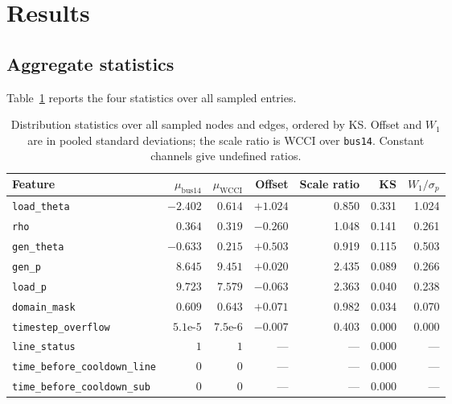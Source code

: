 \section{Results}
\label{sec:wcci-results}

\subsection{Aggregate statistics}

Table~\ref{tab:wcci-shift-all} reports the four statistics over all sampled
entries.

\begin{table}[H]
  \centering
  \small
  \caption{Distribution statistics over all sampled nodes and edges, ordered by
  KS. Offset and $W_1$ are in pooled standard deviations; the scale ratio is
  WCCI over \texttt{bus14}. Constant channels give undefined ratios.}
  \label{tab:wcci-shift-all}
  \setlength{\tabcolsep}{6pt}
  \begin{tabular}{lrrrrrr}
    \toprule
    Feature & $\mu_{\text{bus14}}$ & $\mu_{\text{WCCI}}$ & Offset & Scale ratio & KS & $W_1/\sigma_p$ \\
    \midrule
    \texttt{load\_theta}   & $-2.402$ & $0.614$ & $+1.024$ & 0.850 & 0.331 & 1.024 \\
    \texttt{rho}           & $0.364$ & $0.319$ & $-0.260$ & 1.048 & 0.141 & 0.261 \\
    \texttt{gen\_theta}    & $-0.633$ & $0.215$ & $+0.503$ & 0.919 & 0.115 & 0.503 \\
    \texttt{gen\_p}        & $8.645$ & $9.451$ & $+0.020$ & 2.435 & 0.089 & 0.266 \\
    \texttt{load\_p}       & $9.723$ & $7.579$ & $-0.063$ & 2.363 & 0.040 & 0.238 \\
    \texttt{domain\_mask}  & $0.609$ & $0.643$ & $+0.071$ & 0.982 & 0.034 & 0.070 \\
    \texttt{timestep\_overflow} & $5.1\text{e-}5$ & $7.5\text{e-}6$ & $-0.007$ & 0.403 & 0.000 & 0.000 \\
    \texttt{line\_status}  & $1$ & $1$ & --- & --- & 0.000 & --- \\
    \texttt{time\_before\_cooldown\_line} & $0$ & $0$ & --- & --- & 0.000 & --- \\
    \texttt{time\_before\_cooldown\_sub} & $0$ & $0$ & --- & --- & 0.000 & --- \\
    \bottomrule
  \end{tabular}
\end{table}

